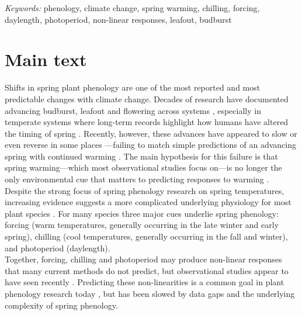 \documentclass[11pt,letter]{article}
\begin{document}
\noindent \emph{Keywords:} phenology, climate change, spring warming, chilling, forcing, daylength, photoperiod, non-linear responses, leafout, budburst\\

\newpage
\linenumbers
\section{Main text} %
Shifts in spring plant phenology are one of the most reported and most predictable changes with climate change. Decades of research have documented advancing budburst, leafout and flowering across systems \citep{delpierre2009, yu2010,Ellwood2012,jochner2013,hereford2017}, especially in temperate systems where long-term records highlight how humans have altered the timing of spring \citep{Schwartz:1997nn,Menzel2003a,menzel2006}. Recently, however, these advances have appeared to slow \citep{fu2015} or even reverse in some places \citep{yu2010}---failing to match simple predictions of an advancing spring with continued warming \citep{Ellwood2012}. The main hypothesis for this failure is that spring warming---which most observational studies focus on---is no longer the only environmental cue that matters to predicting responses to warming \citep{chuine2016,gauzere2019}.\\

Despite the strong focus of spring phenology research on spring temperatures, increasing evidence suggests a more complicated underlying physiology for most plant species \citep[e.g.,][]{zohner2016,gauzere2019,ettinger2020}. For many species three major cues underlie spring phenology: forcing (warm temperatures, generally occurring in the late winter and early spring), chilling (cool temperatures, generally occurring in the fall and winter), and photoperiod (daylength). \\

Together, forcing, chilling and photoperiod may produce non-linear responses that many current methods do not predict, but observational studies appear to have seen recently \citep{fu2015}. Predicting these non-linearities is a common goal in plant phenology research today \citep{gusewell2017,martlusch2017,gauzere2019,chen2019,keenan2019}, but has been slowed by data gaps and the underlying complexity of spring phenology. \\
\end{document}
